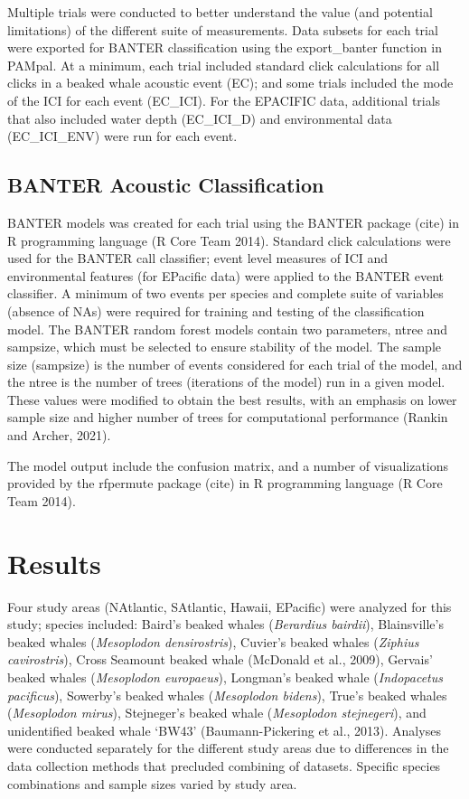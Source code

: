 \documentclass[
  authoryear,
  preprint,
  3p]{elsarticle}
\begin{document}
Multiple trials were conducted to better understand the value (and
potential limitations) of the different suite of measurements. Data
subsets for each trial were exported for BANTER classification using the
export\_banter function in PAMpal. At a minimum, each trial included
standard click calculations for all clicks in a beaked whale acoustic
event (EC); and some trials included the mode of the ICI for each event
(EC\_ICI). For the EPACIFIC data, additional trials that also included
water depth (EC\_ICI\_D) and environmental data (EC\_ICI\_ENV) were run
for each event.

\hypertarget{banter-acoustic-classification}{%
\subsection{BANTER Acoustic
Classification}\label{banter-acoustic-classification}}

BANTER models was created for each trial using the BANTER package (cite)
in R programming language (R Core Team 2014). Standard click
calculations were used for the BANTER call classifier; event level
measures of ICI and environmental features (for EPacific data) were
applied to the BANTER event classifier. A minimum of two events per
species and complete suite of variables (absence of NAs) were required
for training and testing of the classification model. The BANTER random
forest models contain two parameters, ntree and sampsize, which must be
selected to ensure stability of the model. The sample size (sampsize) is
the number of events considered for each trial of the model, and the
ntree is the number of trees (iterations of the model) run in a given
model. These values were modified to obtain the best results, with an
emphasis on lower sample size and higher number of trees for
computational performance (Rankin and Archer, 2021).

The model output include the confusion matrix, and a number of
visualizations provided by the rfpermute package (cite) in R programming
language (R Core Team 2014).

\hypertarget{results}{%
\section{Results}\label{results}}

Four study areas (NAtlantic, SAtlantic, Hawaii, EPacific) were analyzed
for this study; species included: Baird's beaked whales (\emph{Berardius
bairdii}), Blainsville's beaked whales (\emph{Mesoplodon densirostris}),
Cuvier's beaked whales (\emph{Ziphius cavirostris}), Cross Seamount
beaked whale (McDonald et al., 2009), Gervais' beaked whales
(\emph{Mesoplodon europaeus}), Longman's beaked whale (\emph{Indopacetus
pacificus}), Sowerby's beaked whales (\emph{Mesoplodon bidens}), True's
beaked whales (\emph{Mesoplodon mirus}), Stejneger's beaked whale
(\emph{Mesoplodon stejnegeri}), and unidentified beaked whale `BW43'
(Baumann-Pickering et al., 2013). Analyses were conducted separately for
the different study areas due to differences in the data collection
methods that precluded combining of datasets. Specific species
combinations and sample sizes varied by study area.
\end{document}
